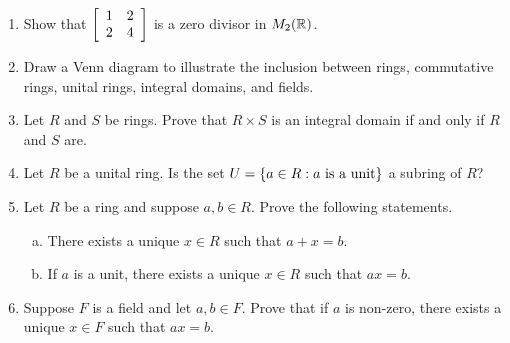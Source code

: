 \documentclass[11pt,fleqn,dvipsnames,usenames]{article}
\begin{document}
\begin{enumerate}[1.]
\item Show that $\MATRIX{rr}{1 & 2\\2 & 4}$ is a zero divisor in $M_{2}(\REAL)$.

\item Draw a Venn diagram to illustrate the inclusion between rings, commutative rings, unital rings, integral domains, and fields.

\item Let $R$ and $S$ be rings.  Prove that $R\times S$ is an integral domain if and only if $R$ and $S$ are.

\item Let $R$ be a unital ring.  Is the set $U = \SET{a\in R:a\text{ is a unit}}$ a subring of $R$?

\item Let $R$ be a ring and suppose $a,b\in R$.  Prove the following statements.
\begin{enumerate}[(a)]
\item There exists a unique $x\in R$ such that $a + x = b$.
\item If $a$ is a unit, there exists a unique $x\in R$ such that $ax=b$.   
\end{enumerate}

\item Suppose $F$ is a field and let $a,b\in F$.  Prove that if $a$ is non-zero, there exists a unique $x\in F$ such that $ax = b$.

\end{enumerate}
\end{document}
